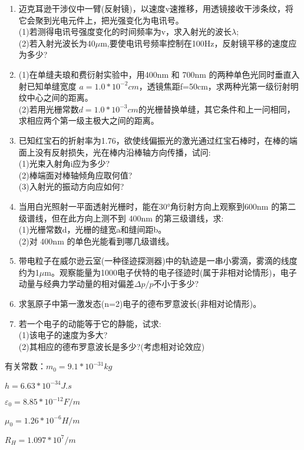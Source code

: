 \begin{enumerate}
\item 迈克耳逊干涉仪中一臂(反射镜)，以速度v速推移，用透镜接收干涉条纹，将它会聚到光电元件上，把光强变化为电讯号。\\
(1)若测得电讯号强度变化的时间频率为v，求入射光的波长$\lambda$;\\
(2)若入射光波长为40$\mu$m,要使电讯号频率控制在100Hz，反射镜平移的速度应为多少?
\item (1)在单缝夫琅和费衍射实验中，用400nm 和 700nm 的两种单色光同时垂直入射已知单缝宽度 $a=1.0*10^{-2}cm$，透镜焦距f=50cm，求两种光第一级衍射明纹中心之间的距离。\\
(2)若用光栅常数$d=1.0*10^{-3}cm$的光栅替换单缝，其它条件和上一问相同，求相应两个第一级主极大之间的距离。
\item 已知红宝石的折射率为1.76，欲使线偏振光的激光通过红宝石棒时，在棒的端面上没有反射损失，光在棒内沿棒轴方向传播，试问:\\
(1)光束入射角i应为多少?\\
(2)棒端面对棒轴倾角应取何值?\\
(3)入射光的振动方向应如何?
\item 当用白光照射一平面透射光栅时，能在30°角衍射方向上观察到600nm 的第二级谱线，但在此方向上测不到 400nm 的第三级谱线，求:\\
(1)光栅常数d，光栅的缝宽a和缝间距b。\\
(2)对 400nm 的单色光能看到哪几级谱线。
\item 带电粒子在威尔逊云室(一种径迹探测器)中的轨迹是一串小雾滴，雾滴的线度约为1$\mu$m。观察能量为1000电子伏特的电子径迹时(属于非相对论情形)，电子动量与经典力学动量的相对偏差$\Delta p/p$不小于多少?
\item 求氢原子中第一激发态(n=2)电子的德布罗意波长(非相对论情形)。
\item 若一个电子的动能等于它的静能，试求:\\
(1)该电子的速度为多大?\\
(2)其相应的德布罗意波长是多少?(考虑相对论效应)
\end{enumerate}


有关常数：$m_0=9.1*10^{-31}kg$

$h=6.63*10^{-34}J.s$

$\varepsilon_0=8.85*10^{-12}F/m$

$\mu_0=1.26*10^{-6}H/m$

$R_H=1.097*10^7/m$